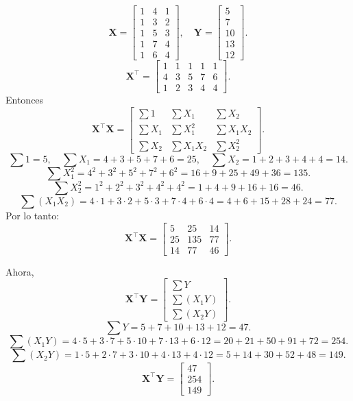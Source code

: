 \documentclass[10pt,a4paper]{article}
\begin{document}
\[
\mathbf{X}
=
\begin{bmatrix}
1 & 4 & 1\\
1 & 3 & 2\\
1 & 5 & 3\\
1 & 7 & 4\\
1 & 6 & 4
\end{bmatrix},
\quad
\mathbf{Y}
=
\begin{bmatrix}
5\\
7\\
10\\
13\\
12
\end{bmatrix}.
\]
\[
\mathbf{X}^\top
=
\begin{bmatrix}
1 & 1 & 1 & 1 & 1 \\
4 & 3 & 5 & 7 & 6 \\
1 & 2 & 3 & 4 & 4
\end{bmatrix}.
\]
Entonces
\[
\mathbf{X}^\top \mathbf{X}
= \begin{bmatrix}
\sum 1 & \sum X_1 & \sum X_2 \\
\sum X_1 & \sum X_1^2 & \sum X_1X_2 \\
\sum X_2 & \sum X_1X_2 & \sum X_2^2
\end{bmatrix}.
\]
\[
\sum 1 = 5,\quad
\sum X_1 = 4+3+5+7+6=25,\quad
\sum X_2 = 1+2+3+4+4=14.
\]
\[
\sum X_1^2 = 4^2 +3^2 +5^2 +7^2 +6^2=16 +9 +25 +49 +36=135.
\]
\[
\sum X_2^2 = 1^2 +2^2 +3^2 +4^2 +4^2=1 +4 +9 +16 +16=46.
\]
\[
\sum (X_1X_2) = 4\cdot1 +3\cdot2 +5\cdot3 +7\cdot4 +6\cdot4 =4 +6 +15 +28 +24=77.
\]
Por lo tanto:
\[
\mathbf{X}^\top \mathbf{X}
=
\begin{bmatrix}
5 & 25 & 14\\
25 &135 & 77\\
14 & 77 & 46
\end{bmatrix}.
\]

Ahora,
\[
\mathbf{X}^\top \mathbf{Y}
=
\begin{bmatrix}
\sum Y\\
\sum (X_1 Y)\\
\sum (X_2 Y)
\end{bmatrix}.
\]
\[
\sum Y =5+7+10+13+12=47.
\]
\[
\sum (X_1 Y)=4\cdot5 +3\cdot7 +5\cdot10 +7\cdot13 +6\cdot12=20 +21 +50 +91 +72=254.
\]
\[
\sum (X_2 Y)=1\cdot5 +2\cdot7 +3\cdot10 +4\cdot13 +4\cdot12=5 +14 +30 +52 +48=149.
\]
\[
\mathbf{X}^\top \mathbf{Y}
=
\begin{bmatrix}
47\\
254\\
149
\end{bmatrix}.
\]
\end{document}
